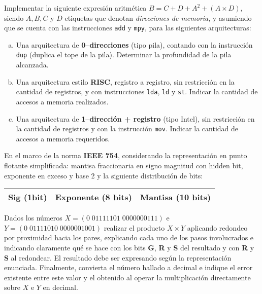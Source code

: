 \documentclass[12pt,a4paper]{article}
\begin{document}

Implementar la siguiente expresión aritmética $B = C + D + A^2 + (A \times D)$, siendo $A, B, C$ y $D$ etiquetas que denotan \textit{direcciones de memoria}, y asumiendo que se cuenta con las instrucciones \texttt{add} y \texttt{mpy}, para las siguientes arquitecturas:
\begin{enumerate}[a)]
	\item Una arquitectura de \textbf{0--direcciones} (tipo pila), contando con la instrucción \texttt{dup} (duplica el tope de la pila). Determinar la profundidad de la pila alcanzada. 
	
	\item Una arquitectura estilo \textbf{RISC}, registro a registro, sin restricción en la cantidad de registros, y con instrucciones \texttt{lda}, \texttt{ld} y \texttt{st}. Indicar la cantidad de accesos a memoria realizados.
	
	\item Una arquitectura de \textbf{1--dirección + registro} (tipo Intel), sin restricción en la cantidad de registros y con la instrucción \texttt{mov}. Indicar la cantidad de accesos a memoria requeridos.	
\end{enumerate}

 En el marco de la norma \textbf{IEEE 754}, considerando la representación en punto flotante simplificada: mantisa fraccionaria en signo magnitud con hidden bit, exponente en exceso y base 2 y la siguiente distribución de bits:
\begin{center}
	\begin{tabular}{|c|c|c|}\hline
		Sig (1bit) & Exponente (8 bits) & Mantisa (10 bits)\\\hline
	\end{tabular}
\end{center}

Dados los números $X = (0\; 01111101\; 0000000111)$ e $Y = (0\; 01111010 \; 0000001001)$ realizar el producto $X \times Y$ aplicando redondeo por proximidad hacia los pares, explicando cada uno de los pasos involucrados e indicando claramente qué se hace con los bits \textbf{G}, \textbf{R} y \textbf{S} del resultado y con \textbf{R} y \textbf{S} al redondear. El resultado debe ser expresando según la representación enunciada. Finalmente, convierta el número hallado a decimal e indique el error existente entre este valor y el obtenido al operar la multiplicación directamente sobre $X$ e $Y$ en decimal.
\end{document}
